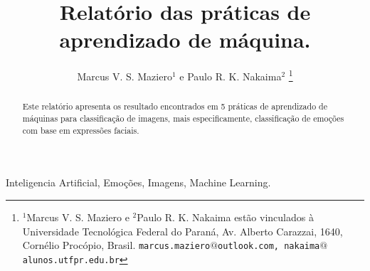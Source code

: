 \documentclass[a4paper, 12 pt, conference]{ieeeconf}  %
\title{\LARGE \bf
Relatório das práticas de aprendizado de máquina.
}
\author{Marcus V. S. Maziero$^{1}$ e Paulo R. K. Nakaima$^{2}$%
\thanks{$^{1}$Marcus V. S. Maziero e $^{2}$Paulo R. K. Nakaima estão vinculados à Universidade Tecnológica Federal do Paraná, Av. Alberto Carazzai, 1640, Cornélio Procópio, Brasil. 
        {\tt\small marcus.maziero$@$outlook.com, nakaima$@$alunos.utfpr.edu.br}}%
}
\begin{document}
\maketitle
\thispagestyle{empty}
\pagestyle{empty}

\begin{abstract}
	Este relatório apresenta os resultado encontrados em 5 práticas de aprendizado de máquinas para classificação de imagens, mais especificamente, classificação de emoções com base em expressões faciais.
\end{abstract}

\begin{keywords}
	Inteligencia Artificial, Emoções, Imagens, Machine Learning.
\end{keywords}


%
%
%
%
\end{document}
